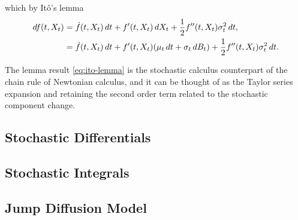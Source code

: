 which by It\^{o}'s lemma
\begin{align}
df(t,X_t)&=\dot{f}(t,X_t)\,dt+f'(t,X_t)\,dX_t+\frac{1}{2}f''(t,X_t)\sigma^2_t\,dt, \notag \\ &=\dot{f}(t,X_t)\,dt+f'(t,X_t)(\mu_t\,dt + \sigma_t\,dB_t)+\frac{1}{2}f''(t,X_t)\sigma^2_t\,dt.
\label{eq:ito-lemma}
\end{align}

The lemma result \eqref{eq:ito-lemma} is the stochastic calculus counterpart of the chain rule of Newtonian calculus, and it can be thought of as the Taylor series expansion and retaining the second order term related to the stochastic component change.

\subsection{Stochastic Differentials}

\subsection{Stochastic Integrals}

\subsection{Jump Diffusion Model}